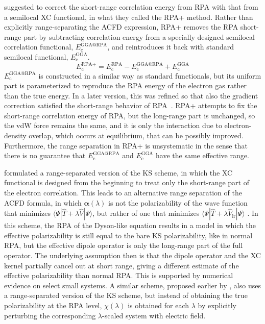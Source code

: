 \citet{KurthPRB99} suggested to correct the short-range correlation energy from RPA with that from a semilocal XC functional, in what they called the RPA+ method.
Rather than explicitly range-separating the ACFD expression, RPA+ removes the RPA short-range part by subtracting correlation energy from a specially designed semilocal correlation functional, $E_\text{c}^\text{GGA@RPA}$, and reintroduces it back with standard semilocal functional, $E_\text{c}^\text{GGA}$.
\begin{equation}
  E_\text{c}^\text{RPA+}=E_\text{c}^\text{RPA}-E_\text{c}^\text{GGA@RPA}+E_\text{c}^\text{GGA}
\end{equation}
$E_\text{c}^\text{GGA@RPA}$ is constructed in a similar way as standard functionals, but its uniform part is parameterized to reproduce the RPA energy of the electron gas rather than the true energy.
In a later version, this was refined so that also the gradient correction satisfied the short-range behavior of RPA~\cite{YanPRB00}.
RPA+ attempts to fix the short-range correlation energy of RPA, but the long-range part is unchanged, so the vdW force remains the same, and it is only the interaction due to electron-density overlap, which occurs at equilibrium, that can be possibly improved.
Furthermore, the range separation in RPA+ is unsystematic in the sense that there is no guarantee that $E_\text{c}^\text{GGA@RPA}$ and $E_\text{c}^\text{GGA}$ have the same effective range.

\citep{ToulousePRA04} formulated a range-separated version of the KS scheme, in which the XC functional is designed from the beginning to treat only the short-range part of the electron correlation.
This leads to an alternative range separation of the ACFD formula, in which $\boldsymbol\alpha(\lambda)$ is not the polarizability of the wave function that minimizes $\langle\Psi|\hat T+\lambda\hat V|\Psi\rangle$, but rather of one that minimizes $\langle\Psi|\hat T+\lambda\hat V_\text{lr}|\Psi\rangle$ \citep{ToulousePRL09}.
In this scheme, the RPA of the Dyson-like equation results in a model in which the effective polarizability is still equal to the bare KS polarizability, like in normal RPA, but the effective dipole operator is only the long-range part of the full operator.
The underlying assumption then is that the dipole operator and the XC kernel partially cancel out at short range, giving a different estimate of the effective polarizability than normal RPA\@.
This is supported by numerical evidence on select small systems.
A similar scheme, proposed earlier by \citet{KohnPRL98}, also uses a range-separated version of the KS scheme, but instead of obtaining the true polarizability at the RPA level, $\chi(\lambda)$ is obtained for each $\lambda$ by explicitly perturbing the corresponding $\lambda$-scaled system with electric field.

